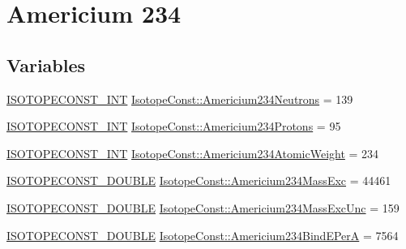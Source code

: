 \hypertarget{group___isotope_const-_americium-_am234}{}\section{Americium 234}
\label{group___isotope_const-_americium-_am234}
\subsection*{Variables}
\begin{DoxyCompactItemize}
\item 
\mbox{\hyperlink{group___isotope_const-_macros_ga5f18360b3e99483a35c32d789e62621c}{I\+S\+O\+T\+O\+P\+E\+C\+O\+N\+S\+T\+\_\+\+I\+NT}} \mbox{\hyperlink{group___isotope_const-_americium-_am234_gaa8f82bf35bb149c3e35e41e57200b8ac}{Isotope\+Const\+::\+Americium234\+Neutrons}} = 139
\item 
\mbox{\hyperlink{group___isotope_const-_macros_ga5f18360b3e99483a35c32d789e62621c}{I\+S\+O\+T\+O\+P\+E\+C\+O\+N\+S\+T\+\_\+\+I\+NT}} \mbox{\hyperlink{group___isotope_const-_americium-_am234_ga44cf41b2825814b66c485ffac69d0388}{Isotope\+Const\+::\+Americium234\+Protons}} = 95
\item 
\mbox{\hyperlink{group___isotope_const-_macros_ga5f18360b3e99483a35c32d789e62621c}{I\+S\+O\+T\+O\+P\+E\+C\+O\+N\+S\+T\+\_\+\+I\+NT}} \mbox{\hyperlink{group___isotope_const-_americium-_am234_ga7952c4e8f01b68f31c19d4154795c41f}{Isotope\+Const\+::\+Americium234\+Atomic\+Weight}} = 234
\item 
\mbox{\hyperlink{group___isotope_const-_macros_ga8f45a7272ce02c0b4c65c44636ed719a}{I\+S\+O\+T\+O\+P\+E\+C\+O\+N\+S\+T\+\_\+\+D\+O\+U\+B\+LE}} \mbox{\hyperlink{group___isotope_const-_americium-_am234_gafacebb59f784a271c4dcdea71835296d}{Isotope\+Const\+::\+Americium234\+Mass\+Exc}} = 44461
\item 
\mbox{\hyperlink{group___isotope_const-_macros_ga8f45a7272ce02c0b4c65c44636ed719a}{I\+S\+O\+T\+O\+P\+E\+C\+O\+N\+S\+T\+\_\+\+D\+O\+U\+B\+LE}} \mbox{\hyperlink{group___isotope_const-_americium-_am234_ga01af407326758c494df9642c43ad253a}{Isotope\+Const\+::\+Americium234\+Mass\+Exc\+Unc}} = 159
\item 
\mbox{\hyperlink{group___isotope_const-_macros_ga8f45a7272ce02c0b4c65c44636ed719a}{I\+S\+O\+T\+O\+P\+E\+C\+O\+N\+S\+T\+\_\+\+D\+O\+U\+B\+LE}} \mbox{\hyperlink{group___isotope_const-_americium-_am234_ga859d5d18b9489b8872896912feb3df3e}{Isotope\+Const\+::\+Americium234\+Bind\+E\+PerA}} = 7564
\item 

\end{DoxyCompactItemize}
